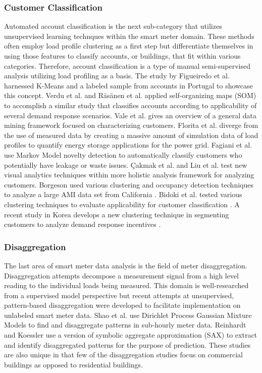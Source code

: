 \subsubsection{Customer Classification}
Automated account classification is the next sub-category that utilizes unsupervised learning technques within the smart meter domain. These methods often employ load profile clustering as a first step but differentiate themselves in using those features to classify accounts, or buildings, that fit within various categories. Therefore, account classification is a type of manual semi-supervised analysis utilizing load profiling as a basis. The study by Figueiredo et al. \cite{figueiredo_electric_2005} harnessed K-Means and a labeled sample from accounts in Portugal to showcase this concept. Verdu et al. \cite{verdu_classification_2006} and R\"as\"anen et al. \cite{rasanen_reducing_2008} applied self-organizing maps (SOM) to accomplish a similar study that classifies accounts according to applicability of several demand response scenarios. Vale et al. \cite{vale_data_2009} gives an overview of a general data mining framework focused on characterizing customers. Florita et al. \cite{florita_classification_2012} diverge from the use of measured data by creating a massive amount of simulation data of load profiles to quantify energy storage applications for the power grid. Fagiani et al. \cite{fagiani_novelty_2015} use Markov Model novelty detection to automatically classify customers who potentially have leakage or waste issues. \c Cakmak et al. \cite{cakmak_new_2014} and Liu et al. \cite{liu_smas:_2015} test new visual analytics techniques within more holistic analysis framework for analyzing customers. Borgeson used various clustering and occupancy detection techniques to analyze a large AMI data set from California \cite{borgeson_targeted_2013}. Bidoki et al. tested various clustering techniques to evaluate applicability for customer classification \cite{bidoki_evaluating_2010}. A recent study in Korea develops a new clustering technique in segmenting customers to analyze demand response incentives \cite{jang_variability_2016}.

\subsubsection{Disaggregation}
The last area of smart meter data analysis is the field of meter disaggregation. Disaggregation attempts decompose a measurement signal from a high level reading to the individual loads being measured. This domain is well-researched from a supervised model perspective but recent attempts at unsupervised, pattern-based disaggregation were developed to facilitate implementation on unlabeled smart meter data. Shao et al. \cite{shao_temporal_2013} use Dirichlet Process Gaussian Mixture Models to find and disaggregate patterns in sub-hourly meter data. Reinhardt and Koessler \cite{reinhardt_powersax:_2014} use a version of symbolic aggregate approximation (SAX) to extract and identify disaggregated patterns for the purpose of prediction. These studies are also unique in that few of the disaggregation studies focus on commercial buildings as opposed to residential buildings.

